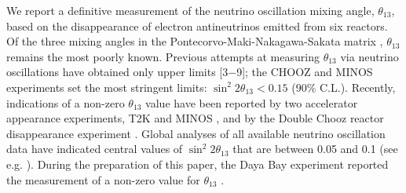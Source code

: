 \documentclass[aps,prl,twocolumn,superscriptaddress,showpacs]{revtex4-1}
\begin{document}

\maketitle




%

We report a definitive measurement of the neutrino oscillation mixing angle, $\theta_{13}$, based on the disappearance of electron antineutrinos emitted from six reactors. Of the three mixing angles in the Pontecorvo-Maki-Nakagawa-Sakata matrix \cite{ref_1, ref_2}, $\theta_{13}$ remains the most poorly known. Previous attempts at measuring $\theta_{13}$ via neutrino oscillations have obtained only upper limits [3$-$9]; the CHOOZ \cite{ref_3} and MINOS \cite{ref_5} experiments set the most stringent limits: $\sin^2 2\theta_{13} < 0.15$ (90\% C.L.). Recently, indications of a non-zero $\theta_{13}$ value have been reported by two accelerator appearance experiments, T2K \cite{ref_10} and MINOS \cite{ref_11}, and by the Double Chooz reactor disappearance experiment \cite{ref_12}. Global analyses of all available neutrino oscillation data have indicated central values of $\sin^2 2\theta_{13}$ that are between 0.05 and 0.1 (see e.g. \cite{ref_13, ref_14}). During the preparation of this paper, the Daya Bay experiment reported the measurement of a non-zero value for $\theta_{13}$ \cite{ref_15}. 
\end{document}
